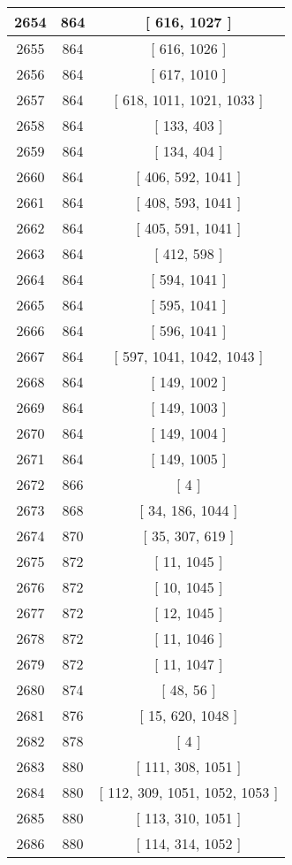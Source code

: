 \begin{center}
\begin{longtable}[H]{|| c c c ||}
\hline
2654 & 864 & [ 616, 1027 ] \\ 
\hline
2655 & 864 & [ 616, 1026 ] \\ 
\hline
2656 & 864 & [ 617, 1010 ] \\ 
\hline
2657 & 864 & [ 618, 1011, 1021, 1033 ] \\ 
\hline
2658 & 864 & [ 133, 403 ] \\ 
\hline
2659 & 864 & [ 134, 404 ] \\ 
\hline
2660 & 864 & [ 406, 592, 1041 ] \\ 
\hline
2661 & 864 & [ 408, 593, 1041 ] \\ 
\hline
2662 & 864 & [ 405, 591, 1041 ] \\ 
\hline
2663 & 864 & [ 412, 598 ] \\ 
\hline
2664 & 864 & [ 594, 1041 ] \\ 
\hline
2665 & 864 & [ 595, 1041 ] \\ 
\hline
2666 & 864 & [ 596, 1041 ] \\ 
\hline
2667 & 864 & [ 597, 1041, 1042, 1043 ] \\ 
\hline
2668 & 864 & [ 149, 1002 ] \\ 
\hline
2669 & 864 & [ 149, 1003 ] \\ 
\hline
2670 & 864 & [ 149, 1004 ] \\ 
\hline
2671 & 864 & [ 149, 1005 ] \\ 
\hline
2672 & 866 & [ 4 ] \\ 
\hline
2673 & 868 & [ 34, 186, 1044 ] \\ 
\hline
2674 & 870 & [ 35, 307, 619 ] \\ 
\hline
2675 & 872 & [ 11, 1045 ] \\ 
\hline
2676 & 872 & [ 10, 1045 ] \\ 
\hline
2677 & 872 & [ 12, 1045 ] \\ 
\hline
2678 & 872 & [ 11, 1046 ] \\ 
\hline
2679 & 872 & [ 11, 1047 ] \\ 
\hline
2680 & 874 & [ 48, 56 ] \\ 
\hline
2681 & 876 & [ 15, 620, 1048 ] \\ 
\hline
2682 & 878 & [ 4 ] \\ 
\hline
2683 & 880 & [ 111, 308, 1051 ] \\ 
\hline
2684 & 880 & [ 112, 309, 1051, 1052, 1053 ] \\ 
\hline
2685 & 880 & [ 113, 310, 1051 ] \\ 
\hline
2686 & 880 & [ 114, 314, 1052 ] \\ 

\end{longtable}
\end{center}
